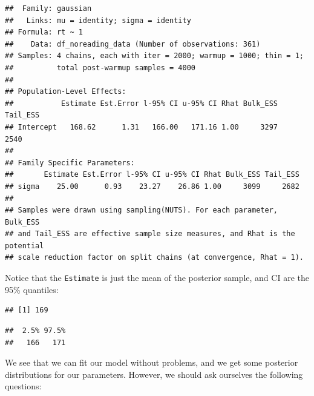 \documentclass[12pt,]{krantz}
\newenvironment{Shaded}{\begin{snugshade}}{\end{snugshade}}
\newcommand{\FloatTok}[1]{\textcolor[rgb]{0.00,0.00,0.81}{#1}}
\newcommand{\KeywordTok}[1]{\textcolor[rgb]{0.13,0.29,0.53}{\textbf{#1}}}
\newcommand{\NormalTok}[1]{#1}
\newcommand{\OperatorTok}[1]{\textcolor[rgb]{0.81,0.36,0.00}{\textbf{#1}}}
\newcommand{\StringTok}[1]{\textcolor[rgb]{0.31,0.60,0.02}{#1}}
\theoremstyle{definition}
\theoremstyle{definition}
\theoremstyle{definition}
\theoremstyle{remark}
\begin{document}
\begin{verbatim}
##  Family: gaussian 
##   Links: mu = identity; sigma = identity 
## Formula: rt ~ 1 
##    Data: df_noreading_data (Number of observations: 361) 
## Samples: 4 chains, each with iter = 2000; warmup = 1000; thin = 1;
##          total post-warmup samples = 4000
## 
## Population-Level Effects: 
##           Estimate Est.Error l-95% CI u-95% CI Rhat Bulk_ESS Tail_ESS
## Intercept   168.62      1.31   166.00   171.16 1.00     3297     2540
## 
## Family Specific Parameters: 
##       Estimate Est.Error l-95% CI u-95% CI Rhat Bulk_ESS Tail_ESS
## sigma    25.00      0.93    23.27    26.86 1.00     3099     2682
## 
## Samples were drawn using sampling(NUTS). For each parameter, Bulk_ESS
## and Tail_ESS are effective sample size measures, and Rhat is the potential
## scale reduction factor on split chains (at convergence, Rhat = 1).
\end{verbatim}

Notice that the \texttt{Estimate} is just the mean of the posterior sample, and
CI are the 95\% quantiles:

\begin{Shaded}
\end{Shaded}

\begin{verbatim}
## [1] 169
\end{verbatim}

\begin{Shaded}
\end{Shaded}

\begin{verbatim}
##  2.5% 97.5% 
##   166   171
\end{verbatim}

We see that we can fit our model without problems, and we get some posterior distributions for our parameters. However, we should ask ourselves the following questions:
\end{document}
